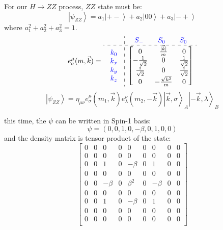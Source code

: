 \documentclass{article}
\newcommand{\ket}[1]{\left|#1\right\rangle}
\begin{document}
For our \(H\rightarrow ZZ\) process, \(ZZ\) state must be:
\[\ket{\psi_{ZZ}}=a_1\ket{+-}+a_2\ket{00}+a_3\ket{-+}\]
where \(a_1^2+a_2^2+a_3^2=1\). 
\[e_\sigma^\mu(m,\vec{k})=\begin{array}{c:c}
	\,\, &		{\color[RGB]{0,0,255}\begin{matrix}
	S_-&	\quad S_0&		\quad S_0\\
\end{matrix}}\\\hdashline{\color[RGB]{0, 0, 255} \begin{array}{c}k_0\\k_x\\k_y\\k_z\\
\end{array}}&		\left[ \begin{matrix}0&		\frac{|\vec{k}|}{m}&		0\\-\frac{1}{\sqrt{2}}&		0&		\frac{1}{\sqrt{2}}\\\frac{i }{\sqrt{2}}&		0&		\frac{i}{\sqrt{2}}\\0&		-\frac{\sqrt{k^2}}{m}&		0\\
\end{matrix} \right]\\
\end{array}\]
\[\ket{\psi_{ZZ}}=\eta_{\mu\nu}e_\sigma^\mu(m_1,\vec{k})e_\lambda^\nu(m_2,-\vec{k})\ket{\vec{k},\sigma}_A\ket{-\vec{k},\lambda}_B \]

this time, the \(\psi\) can be written in Spin-1 basis:
\[\psi=(0,0,1,0,-\beta,0,1,0,0)\]
and the density matrix is tensor product of the state:
\[
    \begin{bmatrix}
     0 & 0 & 0 & 0 & 0 & 0 & 0 & 0 & 0 \\
     0 & 0 & 0 & 0 & 0 & 0 & 0 & 0 & 0 \\
     0 & 0 & 1 & 0 & -\beta  & 0 & 1 & 0 & 0 \\
     0 & 0 & 0 & 0 & 0 & 0 & 0 & 0 & 0 \\
     0 & 0 & -\beta  & 0 & \beta ^2 & 0 & -\beta  & 0 & 0 \\
     0 & 0 & 0 & 0 & 0 & 0 & 0 & 0 & 0 \\
     0 & 0 & 1 & 0 & -\beta  & 0 & 1 & 0 & 0 \\
     0 & 0 & 0 & 0 & 0 & 0 & 0 & 0 & 0 \\
     0 & 0 & 0 & 0 & 0 & 0 & 0 & 0 & 0 \\
    \end{bmatrix}
\]
\end{document}
